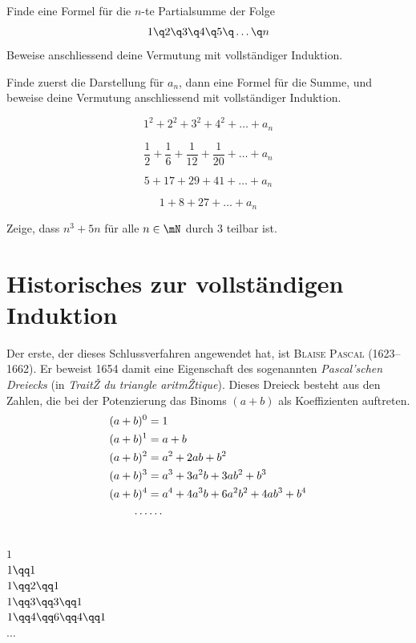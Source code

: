 \documentclass[%
11pt,%
twoside,%
titlepage,%
german,%
headsepline%
]{scrartcl}
\begin{document}
\begin{ueb}
Finde eine Formel f\"ur die $n$-te Partialsumme der Folge
$$1\q2\q3\q4\q5\q\dots\q n$$
Beweise anschliessend deine Vermutung mit vollst\"andiger Induktion.
\end{ueb}

\begin{ueb}
Finde zuerst die Darstellung f\"ur $a_n$, dann eine Formel f\"ur die Summe, und beweise deine Vermutung anschliessend mit vollst\"andiger Induktion.
\begin{enumeratea}
\item $$1^2+2^2+3^2+4^2+\ldots+a_n$$
\item $$\frac{1}{2}+\frac{1}{6}+\frac{1}{12}+\frac{1}{20}+\ldots+a_n$$
\item $$5+17+29+41+\ldots+a_n$$
\item $$1+8+27+\ldots+a_n$$
\end{enumeratea}
\end{ueb}

\begin{ueb}[Teilbarkeit]
Zeige, dass $n^3+5n$ f\"ur alle $n\in\mN$ durch $3$ teilbar ist.
\end{ueb}

\section{Historisches zur vollst\"andigen Induktion}
Der erste, der dieses Schlussverfahren angewendet hat, ist \textsc{Blaise
Pascal} (1623--1662).
Er beweist 1654 damit eine Eigenschaft des sogenannten
\emph{Pascal'schen Dreiecks} (in \emph{TraitŽ du triangle aritmŽtique}).
Dieses Dreieck besteht aus den Zahlen, die bei der Potenzierung das
Binoms $(a+b)$ als Koeffizienten auftreten.
  \begin{align}
    (a+b)^0 &= 1\notag\\
    (a+b)^1 &= a+b\notag\\
    (a+b)^2 &= a^2+2ab+b^2\notag\\
    (a+b)^3 &= a^3+3a^2b+3ab^2+b^3\notag\\
    (a+b)^4 &= a^4+4a^3b+6a^2b^2+4ab^3+b^4\notag\\
    \dots &\dots\notag
  \end{align}

  \begin{center}
    \ \\[2pt]
    $1$\\[6pt]
    $1\qq1$\\[6pt]
    $1\qq2\qq1$\\[6pt]
    $1\qq3\qq3\qq1$\\[6pt]
    $1\qq4\qq6\qq4\qq1$\\[6pt]
    $\dots$
  \end{center}
\end{document}
